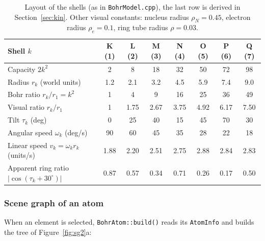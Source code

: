 \documentclass[a4paper, 11pt]{article}
\newcommand{\code}[1]{\texttt{#1}}
\begin{document}
\begin{table}[H]
\centering\small
\begin{tabular}{@{}lccccccc@{}}
\toprule
Shell $k$ & K (1) & L (2) & M (3) & N (4) & O (5) & P (6) & Q (7)\\
\midrule
Capacity $2k^2$              & 2   & 8   & 18  & 32  & 50  & 72  & 98\\
Radius $r_k$ (world units)   & 1.2 & 2.1 & 3.2 & 4.5 & 5.9 & 7.4 & 9.0\\
Bohr ratio $r_k/r_1=k^2$     & 1   & 4   & 9   & 16  & 25  & 36  & 49\\
Visual ratio $r_k/r_1$       & 1   & 1.75& 2.67& 3.75& 4.92& 6.17& 7.50\\
Tilt $\tau_k$ (deg)          & 0   & 25  & 40  & 15  & 45  & 70  & 30\\
Angular speed $\omega_k$ (deg/s) & 90 & 60 & 45 & 35 & 28 & 22 & 18\\
Linear speed $v_k=\omega_k r_k$ (units/s) & 1.88 & 2.20 & 2.51 & 2.75 & 2.88 & 2.84 & 2.83\\
Apparent ring ratio $|\cos(\tau_k+30^\circ)|$ & 0.87 & 0.57 & 0.34 & 0.71 & 0.26 & 0.17 & 0.50\\
\bottomrule
\end{tabular}
\caption{Layout of the shells (as in \code{BohrModel.cpp}), the last row is derived in Section~\ref{sec:kin}. Other visual constants:
nucleus radius $\rho_N=0.45$, electron radius $\rho_e=0.1$, ring tube radius $\rho=0.03$.}
\label{tab:shells}
\end{table}

\subsubsection{Scene graph of an atom}

When an element is selected, \code{BohrAtom::build()} reads its \code{AtomInfo} and builds the tree of Figure~\ref{fig:sg2}a:
\end{document}
